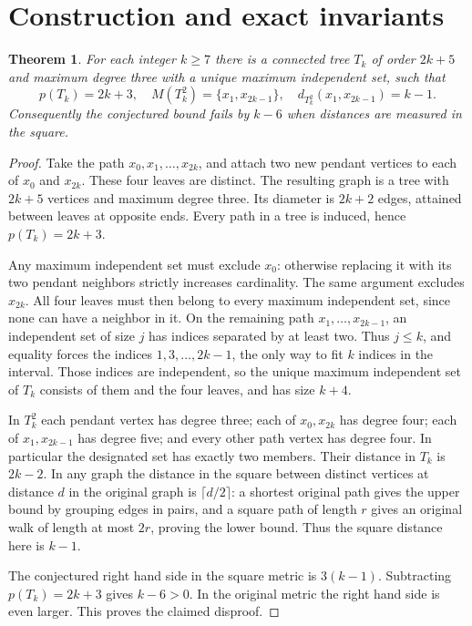 \documentclass[11pt,a4paper]{article}
\newtheorem{theorem}{Theorem}
\begin{document}
\section{Construction and exact invariants}
\begin{theorem}
For each integer $k\ge7$ there is a connected tree $T_k$ of order $2k+5$ and maximum degree three with a unique maximum independent set, such that
\[
p(T_k)=2k+3,\quad
M(T_k^2)=\{x_1,x_{2k-1}\},\quad
d_{T_k^2}(x_1,x_{2k-1})=k-1.
\]
Consequently the conjectured bound fails by $k-6$ when distances are measured in the square.
\end{theorem}
\begin{proof}
Take the path $x_0,x_1,\ldots,x_{2k}$, and attach two new pendant vertices to each of $x_0$ and $x_{2k}$. These four leaves are distinct. The resulting graph is a tree with $2k+5$ vertices and maximum degree three. Its diameter is $2k+2$ edges, attained between leaves at opposite ends. Every path in a tree is induced, hence $p(T_k)=2k+3$.

Any maximum independent set must exclude $x_0$: otherwise replacing it with its two pendant neighbors strictly increases cardinality. The same argument excludes $x_{2k}$. All four leaves must then belong to every maximum independent set, since none can have a neighbor in it. On the remaining path $x_1,\ldots,x_{2k-1}$, an independent set of size $j$ has indices separated by at least two. Thus $j\le k$, and equality forces the indices $1,3,\ldots,2k-1$, the only way to fit $k$ indices in the interval. Those indices are independent, so the unique maximum independent set of $T_k$ consists of them and the four leaves, and has size $k+4$.

In $T_k^2$ each pendant vertex has degree three; each of $x_0,x_{2k}$ has degree four; each of $x_1,x_{2k-1}$ has degree five; and every other path vertex has degree four. In particular the designated set has exactly two members. Their distance in $T_k$ is $2k-2$. In any graph the distance in the square between distinct vertices at distance $d$ in the original graph is $\lceil d/2\rceil$: a shortest original path gives the upper bound by grouping edges in pairs, and a square path of length $r$ gives an original walk of length at most $2r$, proving the lower bound. Thus the square distance here is $k-1$.

The conjectured right hand side in the square metric is $3(k-1)$. Subtracting $p(T_k)=2k+3$ gives $k-6>0$. In the original metric the right hand side is even larger. This proves the claimed disproof.
\end{proof}
\end{document}
